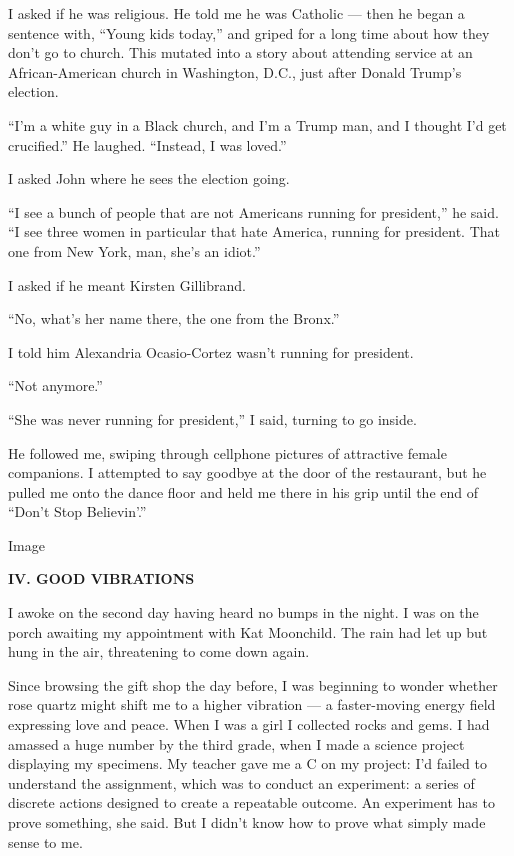 I asked if he was religious. He told me he was Catholic --- then he
began a sentence with, ``Young kids today,'' and griped for a long time
about how they don't go to church. This mutated into a story about
attending service at an African-American church in Washington, D.C.,
just after Donald Trump's election.

``I'm a white guy in a Black church, and I'm a Trump man, and I thought
I'd get crucified.'' He laughed. ``Instead, I was loved.''

I asked John where he sees the election going.

``I see a bunch of people that are not Americans running for
president,'' he said. ``I see three women in particular that hate
America, running for president. That one from New York, man, she's an
idiot.''

I asked if he meant Kirsten Gillibrand.

``No, what's her name there, the one from the Bronx.''

I told him Alexandria Ocasio-Cortez wasn't running for president.

``Not anymore.''

``She was never running for president,'' I said, turning to go inside.

He followed me, swiping through cellphone pictures of attractive female
companions. I attempted to say goodbye at the door of the restaurant,
but he pulled me onto the dance floor and held me there in his grip
until the end of ``Don't Stop Believin'.''

Image

\textbf{IV. GOOD VIBRATIONS}

I awoke on the second day having heard no bumps in the night. I was on
the porch awaiting my appointment with Kat Moonchild. The rain had let
up but hung in the air, threatening to come down again.

Since browsing the gift shop the day before, I was beginning to wonder
whether rose quartz might shift me to a higher vibration --- a
faster-moving energy field expressing love and peace. When I was a girl
I collected rocks and gems. I had amassed a huge number by the third
grade, when I made a science project displaying my specimens. My teacher
gave me a C on my project: I'd failed to understand the assignment,
which was to conduct an experiment: a series of discrete actions
designed to create a repeatable outcome. An experiment has to prove
something, she said. But I didn't know how to prove what simply made
sense to me.

